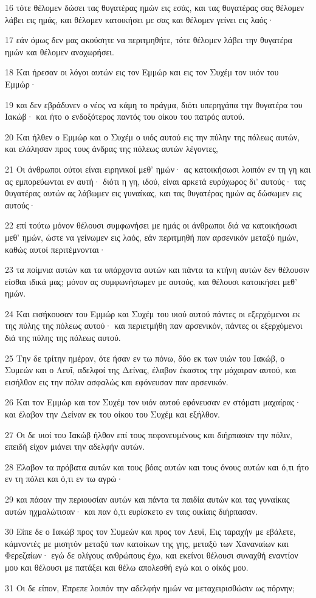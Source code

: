 \par 16 τότε θέλομεν δώσει τας θυγατέρας ημών εις εσάς, και τας θυγατέρας σας θέλομεν λάβει εις ημάς, και θέλομεν κατοικήσει με σας και θέλομεν γείνει εις λαός·
\par 17 εάν όμως δεν μας ακούσητε να περιτμηθήτε, τότε θέλομεν λάβει την θυγατέρα ημών και θέλομεν αναχωρήσει.
\par 18 Και ήρεσαν οι λόγοι αυτών εις τον Εμμώρ και εις τον Συχέμ τον υιόν του Εμμώρ·
\par 19 και δεν εβράδυνεν ο νέος να κάμη το πράγμα, διότι υπερηγάπα την θυγατέρα του Ιακώβ· και ήτο ο ενδοξότερος παντός του οίκου του πατρός αυτού.
\par 20 Και ήλθεν ο Εμμώρ και ο Συχέμ ο υιός αυτού εις την πύλην της πόλεως αυτών, και ελάλησαν προς τους άνδρας της πόλεως αυτών λέγοντες,
\par 21 Οι άνθρωποι ούτοι είναι ειρηνικοί μεθ' ημών· ας κατοικήσωσι λοιπόν εν τη γη και ας εμπορεύωνται εν αυτή· διότι η γη, ιδού, είναι αρκετά ευρύχωρος δι' αυτούς· τας θυγατέρας αυτών ας λάβωμεν εις γυναίκας, και τας θυγατέρας ημών ας δώσωμεν εις αυτούς·
\par 22 επί τούτω μόνον θέλουσι συμφωνήσει με ημάς οι άνθρωποι διά να κατοικήσωσι μεθ' ημών, ώστε να γείνωμεν εις λαός, εάν περιτμηθή παν αρσενικόν μεταξύ ημών, καθώς αυτοί περιτέμνονται·
\par 23 τα ποίμνια αυτών και τα υπάρχοντα αυτών και πάντα τα κτήνη αυτών δεν θέλουσιν είσθαι ιδικά μας; μόνον ας συμφωνήσωμεν με αυτούς, και θέλουσι κατοικήσει μεθ' ημών.
\par 24 Και εισήκουσαν του Εμμώρ και Συχέμ του υιού αυτού πάντες οι εξερχόμενοι εκ της πύλης της πόλεως αυτού· και περιετμήθη παν αρσενικόν, πάντες οι εξερχόμενοι διά της πύλης της πόλεως αυτού.
\par 25 Την δε τρίτην ημέραν, ότε ήσαν εν τω πόνω, δύο εκ των υιών του Ιακώβ, ο Συμεών και ο Λευΐ, αδελφοί της Δείνας, έλαβον έκαστος την μάχαιραν αυτού, και εισήλθον εις την πόλιν ασφαλώς και εφόνευσαν παν αρσενικόν.
\par 26 Και τον Εμμώρ και τον Συχέμ τον υιόν αυτού εφόνευσαν εν στόματι μαχαίρας· και έλαβον την Δείναν εκ του οίκου του Συχέμ και εξήλθον.
\par 27 Οι δε υιοί του Ιακώβ ήλθον επί τους πεφονευμένους και διήρπασαν την πόλιν, επειδή είχον μιάνει την αδελφήν αυτών.
\par 28 Έλαβον τα πρόβατα αυτών και τους βόας αυτών και τους όνους αυτών και ό,τι ήτο εν τη πόλει και ό,τι εν τω αγρώ·
\par 29 και πάσαν την περιουσίαν αυτών και πάντα τα παιδία αυτών και τας γυναίκας αυτών ηχμαλώτισαν· και παν ό,τι ευρίσκετο εν ταις οικίαις διήρπασαν.
\par 30 Είπε δε ο Ιακώβ προς τον Συμεών και προς τον Λευΐ, Εις ταραχήν με εβάλετε, κάμνοντές με μισητόν μεταξύ των κατοίκων της γης, μεταξύ των Χαναναίων και Φερεζαίων· εγώ δε ολίγους ανθρώπους έχω, και εκείνοι θέλουσι συναχθή εναντίον μου και θέλουσι με πατάξει και θέλω απολεσθή εγώ και ο οίκός μου.
\par 31 Οι δε είπον, Έπρεπε λοιπόν την αδελφήν ημών να μεταχειρισθώσιν ως πόρνην;


